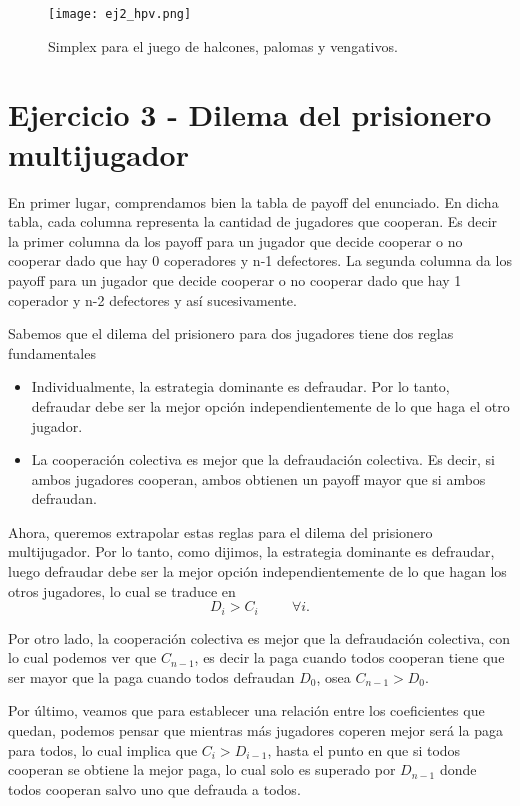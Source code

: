 \documentclass[letterpaper,12pt]{article}
\theoremstyle{plain}
\begin{document}
\begin{figure}[h]
    \centering
    \texttt{[image: ej2\_hpv.png]}
    \caption{Simplex para el juego de halcones, palomas y vengativos.} 
    \label{fig:ej2_hpv}
\end{figure}

\section*{Ejercicio 3 - Dilema del prisionero multijugador}

En primer lugar, comprendamos bien la tabla de payoff del enunciado. En dicha tabla, cada columna representa la cantidad de jugadores que cooperan. Es decir la primer columna da los payoff para un jugador que decide cooperar o no cooperar dado que hay 0 coperadores y n-1 defectores. La segunda columna da los payoff para un jugador que decide cooperar o no cooperar dado que hay 1 coperador y n-2 defectores y así sucesivamente. 

Sabemos que el dilema del prisionero para dos jugadores tiene dos reglas fundamentales
\begin{itemize}
    \item Individualmente, la estrategia dominante es defraudar. Por lo tanto, defraudar debe ser la mejor opción independientemente de lo que haga el otro jugador.
    \item La cooperación colectiva es mejor que la defraudación colectiva. Es decir, si ambos jugadores cooperan, ambos obtienen un payoff mayor que si ambos defraudan.
\end{itemize}

Ahora, queremos extrapolar estas reglas para el dilema del prisionero multijugador. Por lo tanto, como dijimos, la estrategia dominante es defraudar, luego defraudar debe ser la mejor opción independientemente de lo que hagan los otros jugadores, lo cual se traduce en 
\begin{equation}
    D_i > C_i \hspace{1cm} \forall i.
\end{equation}

Por otro lado, la cooperación colectiva es mejor que la defraudación colectiva, con lo cual podemos ver que $C_{n-1}$, es decir la paga cuando todos cooperan tiene que ser mayor que la paga cuando todos defraudan $D_0$, osea $C_{n-1} > D_0$.

Por último, veamos que para establecer una relación entre los coeficientes que quedan, podemos pensar que mientras más jugadores coperen mejor será la paga para todos, lo cual implica que $C_i > D_{i-1}$, hasta el punto en que si todos cooperan se obtiene la mejor paga, lo cual solo es superado por $D_{n-1}$ donde todos cooperan salvo uno que defrauda a todos.
\end{document}
